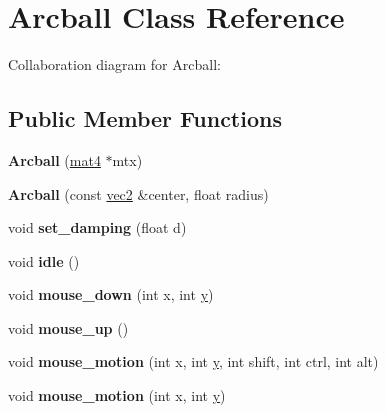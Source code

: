 \hypertarget{class_arcball}{\section{Arcball Class Reference}
\label{class_arcball}
}


Collaboration diagram for Arcball\+:
\subsection*{Public Member Functions}
\begin{DoxyCompactItemize}
\item 
\hypertarget{class_arcball_a6e87bc32b08b572898cbc39741840b08}{{\bfseries Arcball} (\hyperlink{classmat4}{mat4} $\ast$mtx)}\label{class_arcball_a6e87bc32b08b572898cbc39741840b08}

\item 
\hypertarget{class_arcball_a3eeaf68e1983e08a53ae1f939aaab998}{{\bfseries Arcball} (const \hyperlink{classvec2}{vec2} \&center, float radius)}\label{class_arcball_a3eeaf68e1983e08a53ae1f939aaab998}

\item 
\hypertarget{class_arcball_a88a31d0e9b94ec8640d350f6645f3678}{void {\bfseries set\+\_\+damping} (float d)}\label{class_arcball_a88a31d0e9b94ec8640d350f6645f3678}

\item 
\hypertarget{class_arcball_a2d4725a29ba1e6542ead0aeaf8e818d7}{void {\bfseries idle} ()}\label{class_arcball_a2d4725a29ba1e6542ead0aeaf8e818d7}

\item 
\hypertarget{class_arcball_af68551c34a6a63f9e3ecf7995fff82ad}{void {\bfseries mouse\+\_\+down} (int x, int \hyperlink{_ice_utils_8h_aa7ffaed69623192258fb8679569ff9ba}{y})}\label{class_arcball_af68551c34a6a63f9e3ecf7995fff82ad}

\item 
\hypertarget{class_arcball_aca28da4e0270a68b248a58a9605056c6}{void {\bfseries mouse\+\_\+up} ()}\label{class_arcball_aca28da4e0270a68b248a58a9605056c6}

\item 
\hypertarget{class_arcball_a548ddff008dfd260069329ad14c988f2}{void {\bfseries mouse\+\_\+motion} (int x, int \hyperlink{_ice_utils_8h_aa7ffaed69623192258fb8679569ff9ba}{y}, int shift, int ctrl, int alt)}\label{class_arcball_a548ddff008dfd260069329ad14c988f2}

\item 
\hypertarget{class_arcball_ab6c81c8ebfeb0624e4f5998a8bdf4d93}{void {\bfseries mouse\+\_\+motion} (int x, int \hyperlink{_ice_utils_8h_aa7ffaed69623192258fb8679569ff9ba}{y})}\label{class_arcball_ab6c81c8ebfeb0624e4f5998a8bdf4d93}


\end{DoxyCompactItemize}
